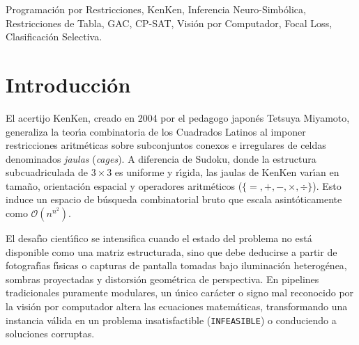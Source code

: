 \documentclass[conference]{IEEEtran}
\begin{document}
\begin{IEEEkeywords}
Programaci\'on por Restricciones, KenKen, Inferencia Neuro-Simb\'olica, Restricciones de Tabla, GAC, CP-SAT, Visi\'on por Computador, Focal Loss, Clasificaci\'on Selectiva.
\end{IEEEkeywords}

\section{Introducci\'on}
El acertijo KenKen, creado en 2004 por el pedagogo japon\'es Tetsuya Miyamoto, generaliza la teor\'{\i}a combinatoria de los Cuadrados Latinos al imponer restricciones aritm\'eticas sobre subconjuntos conexos e irregulares de celdas denominados \textit{jaulas} (\textit{cages}). A diferencia de Sudoku, donde la estructura subcuadriculada de $3 \times 3$ es uniforme y r\'{\i}gida, las jaulas de KenKen var\'{\i}an en tama\~no, orientaci\'on espacial y operadores aritm\'eticos ($\{=, +, -, \times, \div\}$). Esto induce un espacio de b\'usqueda combinatorial bruto que escala asint\'oticamente como $\mathcal{O}(n^{n^2})$.

El desaf\'{\i}o cient\'{\i}fico se intensifica cuando el estado del problema no est\'a disponible como una matriz estructurada, sino que debe deducirse a partir de fotograf\'{\i}as f\'{\i}sicas o capturas de pantalla tomadas bajo iluminaci\'on heterog\'enea, sombras proyectadas y distorsi\'on geom\'etrica de perspectiva. En pipelines tradicionales puramente modulares, un \'unico car\'acter o signo mal reconocido por la visi\'on por computador altera las ecuaciones matem\'aticas, transformando una instancia v\'alida en un problema insatisfactible (\texttt{INFEASIBLE}) o conduciendo a soluciones corruptas.
\end{document}
